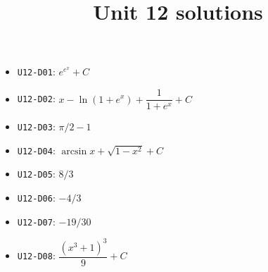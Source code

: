 
\title{Unit 12 solutions}

\maketitle
\begin{itemize}
  \item \texttt{U12-D01}: $e^{e^{x}}+C$
  \item \texttt{U12-D02}: $x-\ln(1+e^{x})+\dfrac{1}{1+e^{x}}+C$
  \item \texttt{U12-D03}: $\pi/2-1$
  \item \texttt{U12-D04}: $\arcsin x+\sqrt{1-x^{2}}+C$
  \item \texttt{U12-D05}: $8/3$
  \item \texttt{U12-D06}: $-4/3$
  \item \texttt{U12-D07}: $-19/30$
  \item \texttt{U12-D08}: $\dfrac{(x^{3}+1)^{3}}{9}+C$
\end{itemize}

